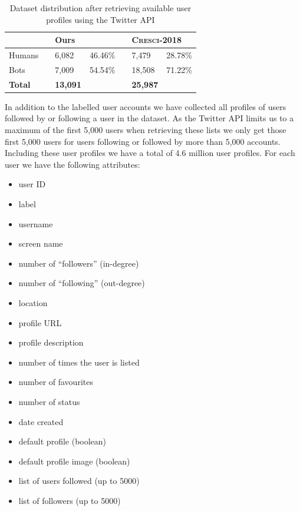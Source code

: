 \begin{table}[t]
\centering
\begin{tabular}{@{}lllllll@{}}
\toprule
       &  & \multicolumn{2}{l}{Ours} &  & \multicolumn{2}{l}{\textsc{Cresci-2018}} \\ \midrule
Humans &  & 6,082       & 46.46\%     &  & 7,479          & 28.78\%         \\
Bots   &  & 7,009       & 54.54\%     &  & 18,508         & 71.22\%         \\ \midrule
\textbf{Total}  &  & \textbf{13,091}      &        &  & \textbf{25,987}         &            \\ \bottomrule
\end{tabular}
\caption{Dataset distribution after retrieving available user profiles using the Twitter API}
\label{tab:dataset}
\end{table}

In addition to the labelled user accounts we have collected all profiles of users followed by or following a user in the dataset. As the Twitter API limits us to a maximum of the first 5,000 users when retrieving these lists we only get those first 5,000 users for users following or followed by more than 5,000 accounts. Including these user profiles we have a total of 4.6 million user profiles. For each user we have the following attributes:

\begin{multicols}{2}
\begin{itemize}
    \item user ID
    \item label
    \item username
    \item screen name
    \item number of “followers” (in-degree)
    \item number of “following” (out-degree)
    \item location
    \item profile URL
    \item profile description
    \item number of times the user is listed
    \item number of favourites
    \item number of status
    \item date created
    \item default profile (boolean)
    \item default profile image (boolean)
    \item list of users followed (up to 5000)
    \item list of followers (up to 5000)
\end{itemize}
\end{multicols}

